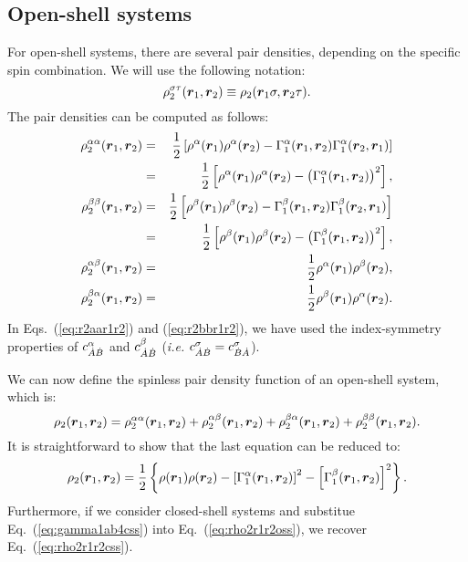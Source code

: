\subsection{Open-shell systems}

For open-shell systems, there are several pair densities, depending on the specific spin
combination. We will use the following notation:
%
\begin{equation}
   \rho_2^{\sigma\tau}(\boldsymbol{r}_1,\boldsymbol{r}_2)\equiv\rho_2(\boldsymbol{r}_1\sigma,\boldsymbol{r}_2\tau).
\end{equation}
%
The pair densities can be computed as follows:
%
\begin{eqnarray}
	\rho_2^{\alpha\alpha}(\boldsymbol{r}_1,\boldsymbol{r}_2) & = & \frac{1}{2}\left[\rho^{\alpha}(\boldsymbol{r}_1)\rho^{\alpha}(\boldsymbol{r}_2)
	-\Gamma_1^{\alpha}(\boldsymbol{r}_1,\boldsymbol{r}_2)\Gamma_1^{\alpha}(\boldsymbol{r}_2,\boldsymbol{r}_1)\right]\nonumber\\
	                                   & = & \frac{1}{2}\left[\rho^{\alpha}(\boldsymbol{r}_1)\rho^{\alpha}(\boldsymbol{r}_2)
	-\big(\Gamma_1^{\alpha}(\boldsymbol{r}_1,\boldsymbol{r}_2)\big)^2\right],\label{eq:r2aar1r2}\\
	\rho_2^{\beta\beta}(\boldsymbol{r}_1,\boldsymbol{r}_2) & = & \frac{1}{2}\left[\rho^{\beta}(\boldsymbol{r}_1)\rho^{\beta}(\boldsymbol{r}_2)
	-\Gamma_1^{\beta}(\boldsymbol{r}_1,\boldsymbol{r}_2)\Gamma_1^{\beta}(\boldsymbol{r}_2,\boldsymbol{r}_1)\right]\nonumber\\
	                                 & = & \frac{1}{2}\left[\rho^{\beta}(\boldsymbol{r}_1)\rho^{\beta}(\boldsymbol{r}_2)
	-\big(\Gamma_1^{\beta}(\boldsymbol{r}_1,\boldsymbol{r}_2)\big)^2\right],\label{eq:r2bbr1r2}\\
	\rho_2^{\alpha\beta}(\boldsymbol{r}_1,\boldsymbol{r}_2) & = & \frac{1}{2}\rho^{\alpha}(\boldsymbol{r}_1)\rho^{\beta}(\boldsymbol{r}_2),\label{eq:r2abr1r2}\\
	\rho_2^{\beta\alpha}(\boldsymbol{r}_1,\boldsymbol{r}_2) & = & \frac{1}{2}\rho^{\beta}(\boldsymbol{r}_1)\rho^{\alpha}(\boldsymbol{r}_2).\label{eq:r2bar1r2}
\end{eqnarray}
%
In Eqs.~(\ref{eq:r2aar1r2}) and (\ref{eq:r2bbr1r2}), we have used the index-symmetry properties of
$c^{\alpha}_{\dot{A}\dot{B}}$ and $c^{\beta}_{\dot{A}\dot{B}}$ (\textit{i.e.} $c^{\sigma}_{\dot{A}\dot{B}}=c^{\sigma}_{\dot{B}\dot{A}}$).
%

We can now define the spinless pair density function of an open-shell system, which is:
\begin{equation}
	\rho_2(\boldsymbol{r}_1,\boldsymbol{r}_2)=\rho_2^{\alpha\alpha}(\boldsymbol{r}_1,\boldsymbol{r}_2)+\rho_2^{\alpha\beta}(\boldsymbol{r}_1,\boldsymbol{r}_2)
	+\rho_2^{\beta\alpha}(\boldsymbol{r}_1,\boldsymbol{r}_2)+\rho_2^{\beta\beta}(\boldsymbol{r}_1,\boldsymbol{r}_2).
\end{equation}
%
It is straightforward to show that the last equation can be reduced to:
%
\begin{equation}\label{eq:rho2r1r2oss}
	\rho_2(\boldsymbol{r}_1,\boldsymbol{r}_2)=\frac{1}{2}\left\{\rho(\boldsymbol{r}_1)\rho(\boldsymbol{r}_2)-\left[\Gamma_1^{\alpha}(\boldsymbol{r}_1,\boldsymbol{r}_2)\right]^2
	                                         -\left[\Gamma_1^{\beta}(\boldsymbol{r}_1,\boldsymbol{r}_2)\right]^2\right\}.
\end{equation}
%
Furthermore, if we consider closed-shell systems and substitue Eq.~(\ref{eq:gamma1ab4css})
into Eq.~(\ref{eq:rho2r1r2oss}), we
recover Eq.~(\ref{eq:rho2r1r2css}).

